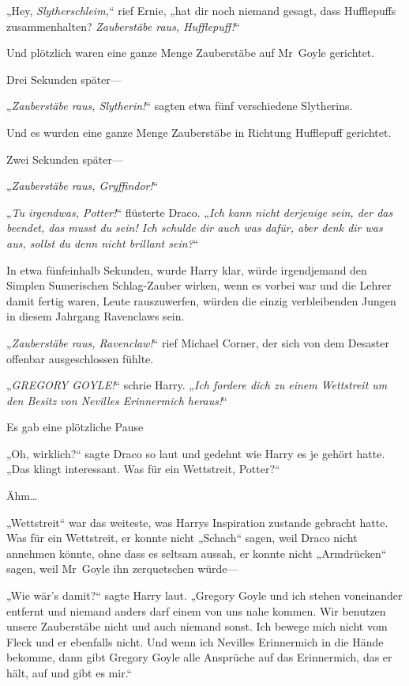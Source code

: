 {„Hey, \emph{Slytherschleim,}“ rief Ernie, „hat dir noch niemand gesagt, dass Hufflepuffs zusammenhalten? \emph{Zauberstäbe raus, Hufflepuff!}“

Und plötzlich waren eine ganze Menge Zauberstäbe auf Mr~Goyle gerichtet.

Drei Sekunden später—

„\emph{Zauberstäbe raus, Slytherin!}“ sagten etwa fünf verschiedene Slytherins.

Und es wurden eine ganze Menge Zauberstäbe in Richtung Hufflepuff gerichtet.

Zwei Sekunden später—

„\emph{Zauberstäbe raus, Gryffindor!}“

„\emph{Tu irgendwas, Potter!}“ flüsterte Draco. „\emph{Ich kann nicht derjenige sein, der das beendet, das musst du sein! Ich schulde dir auch was dafür, aber denk dir was aus, sollst du denn nicht brillant sein?}“

In etwa fünfeinhalb Sekunden, wurde Harry klar, würde irgendjemand den Simplen Sumerischen Schlag-Zauber wirken, wenn es vorbei war und die Lehrer damit fertig waren, Leute rauszuwerfen, würden die einzig verbleibenden Jungen in diesem Jahrgang Ravenclaws sein.

„\emph{Zauberstäbe raus, Ravenclaw!}“ rief Michael Corner, der sich von dem Desaster offenbar ausgeschlossen fühlte.

„\emph{GREGORY GOYLE!}“ schrie Harry. „\emph{Ich fordere dich zu einem Wettstreit um den Besitz von Nevilles Erinnermich heraus!}“

Es gab eine plötzliche Pause

„Oh, wirklich?“ sagte Draco so laut und gedehnt wie Harry es je gehört hatte. „Das klingt interessant. Was für ein Wettstreit, Potter?“

Ähm…

„Wettstreit“ war das weiteste, was Harrys Inspiration zustande gebracht hatte. Was für ein Wettstreit, er konnte nicht „Schach“ sagen, weil Draco nicht annehmen könnte, ohne dass es seltsam aussah, er konnte nicht „Armdrücken“ sagen, weil Mr~Goyle ihn zerquetschen würde—

„Wie wär's damit?“ sagte Harry laut. „Gregory Goyle und ich stehen voneinander entfernt und niemand anders darf einem von uns nahe kommen. Wir benutzen unsere Zauberstäbe nicht und auch niemand sonst. Ich bewege mich nicht vom Fleck und er ebenfalls nicht. Und wenn ich Nevilles Erinnermich in die Hände bekomme, dann gibt Gregory Goyle alle Ansprüche auf das Erinnermich, das er hält, auf und gibt es mir.“

}
